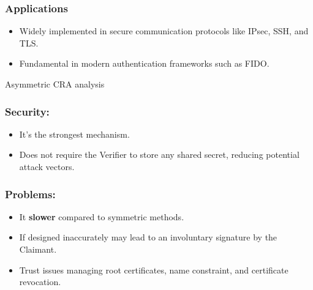 \subsubsection{Applications}
\begin{itemize}
    \item  Widely implemented in secure communication protocols like IPsec, SSH, and TLS.
    \item Fundamental in modern authentication frameworks such as FIDO.
\end{itemize}
\begin{quotebox}[colframe=blue!10!white, colback=blue!5!white]{Asymmetric CRA analysis}
    \begin{minipage}{0.5\textwidth}
        \vspace{-1.1cm}
        \subsubsection{Security:}
        \begin{itemize}
            \item It's the strongest mechanism.
            \item Does not require the Verifier to store any shared secret, reducing potential attack vectors.
        \end{itemize}
     \end{minipage} 
     \hspace{0cm}
     \begin{minipage}{0.5\textwidth}
        \subsubsection{Problems:}
        \begin{itemize}
            \item It \textbf{slower} compared to symmetric methods.
            \item If designed inaccurately may lead to an involuntary signature
            by the Claimant.
            \item Trust issues managing root certificates, name constraint, and certificate revocation.
        \end{itemize}
     \end{minipage}
\end{quotebox}

